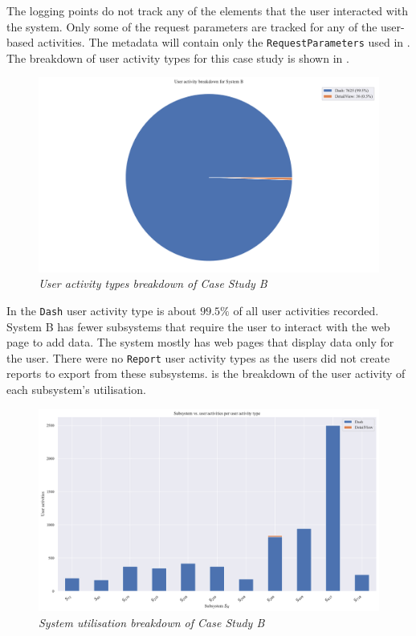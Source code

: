 The logging points do not track any of the elements that the user interacted with the system. Only some of the request parameters are tracked for any of the user-based activities. The metadata will contain only the \texttt{RequestParameters} used in . The breakdown of user activity types for this case study is shown in .

\clearpage

\begin{figure}[!htb]
	\centering %
	\includegraphics[width=0.95\linewidth]{img/ch3/analysis/case_B_breakdown.pdf}
	\caption[User activity types breakdown of Case Study B]
	{\textit{User activity types breakdown of Case Study B}}\label{fig:ch3_caseBBreakdown}
\end{figure}

In  the \texttt{Dash} user activity type is about $99.5\%$ of all user activities recorded. System B has fewer subsystems that require the user to interact with the web page to add data. The system mostly has web pages that display data only for the user. There were no \texttt{Report} user activity types as the users did not create reports to export from these subsystems.  is the breakdown of the user activity of each subsystem's utilisation.

\begin{figure}[!htb]
	\centering %
	\includegraphics[width=0.95\linewidth]{img/ch3/analysis/case_B_subsystems_1.pdf}
	\caption[System utilisation breakdown of Case Study B]
	{\textit{System utilisation breakdown of Case Study B}}\label{fig:ch3_caseBAnalysis}
\end{figure} 

